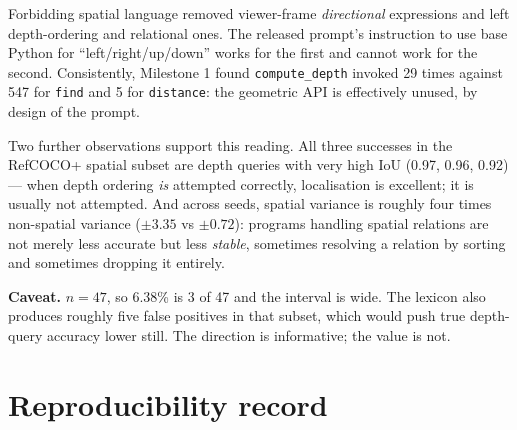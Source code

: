 \documentclass[11pt,a4paper]{article}
\begin{document}
\vspace{4pt}
Forbidding spatial language removed viewer-frame \emph{directional} expressions and
left depth-ordering and relational ones. The released prompt's instruction to use
base Python for ``left/right/up/down'' works for the first and cannot work for the
second. Consistently, Milestone 1 found \texttt{compute\_depth} invoked 29 times
against 547 for \texttt{find} and 5 for \texttt{distance}: the geometric API is
effectively unused, by design of the prompt.

Two further observations support this reading. All three successes in the RefCOCO+
spatial subset are depth queries with very high IoU (0.97, 0.96, 0.92) --- when depth
ordering \emph{is} attempted correctly, localisation is excellent; it is usually not
attempted. And across seeds, spatial variance is roughly four times non-spatial
variance ($\pm3.35$ vs $\pm0.72$): programs handling spatial relations are not merely
less accurate but less \emph{stable}, sometimes resolving a relation by sorting and
sometimes dropping it entirely.

\textbf{Caveat.} $n{=}47$, so 6.38\% is 3 of 47 and the interval is wide. The lexicon
also produces roughly five false positives in that subset, which would push true
depth-query accuracy lower still. The direction is informative; the value is not.

\section{Reproducibility record}
\end{document}
